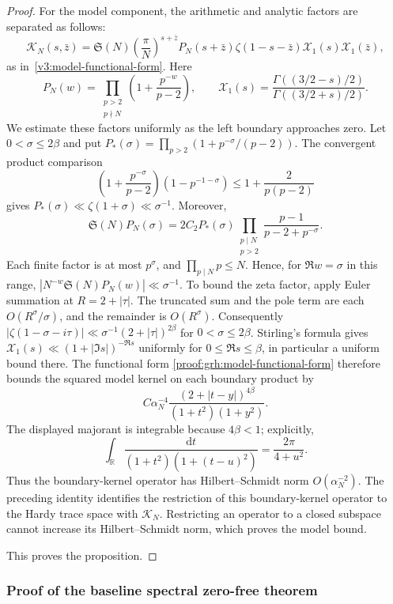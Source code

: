 \documentclass[12pt,a4paper]{amsart}
\numberwithin{equation}{section}
\def\le{\leqslant}
\theoremstyle{plain}
\theoremstyle{definition}
\theoremstyle{remark}
\begin{document}
\begin{proof}
For the model component, the arithmetic and analytic factors are
separated as follows:
\begin{equation}\label{proof:grh:model-functional-form}
 \mathscr K_N(s,\bar z)=\mathfrak S(N)
 \left(\frac\pi N\right)^{s+\bar z}P_N(s+\bar z)
 \zeta(1-s-\bar z)\mathcal X_1(s)\mathcal X_1(\bar z),
\end{equation}
as in~\eqref{v3:model-functional-form}.
Here
\[
 P_N(w)=\prod_{\substack{p>2\\p\nmid N}}
       \left(1+\frac{p^{-w}}{p-2}\right),\qquad
 \mathcal X_1(s)=\frac{\Gamma((3/2-s)/2)}{\Gamma((3/2+s)/2)}.
\]
We estimate these factors uniformly as the left boundary approaches
zero. Let $0<\sigma\le2\beta$ and put
$P_*(\sigma)=\prod_{p>2}(1+p^{-\sigma}/(p-2))$.
The convergent product comparison
\[
 \left(1+\frac{p^{-\sigma}}{p-2}\right)(1-p^{-1-\sigma})
 \le1+\frac2{p(p-2)}
\]
gives $P_*(\sigma)\ll\zeta(1+\sigma)\ll\sigma^{-1}$.
Moreover,
\[
 \mathfrak S(N)P_N(\sigma)
 =2C_2P_*(\sigma)
   \prod_{\substack{p\mid N\\p>2}}
        \frac{p-1}{p-2+p^{-\sigma}}.
\]
Each finite factor is at most $p^\sigma$, and
$\prod_{p\mid N}p\le N$. Hence, for $\Re w=\sigma$ in this range,
$|N^{-w}\mathfrak S(N)P_N(w)|\ll\sigma^{-1}$.
To bound the zeta factor, apply Euler summation at
$R=2+|\tau|$. The truncated sum and the pole term are each
$O(R^\sigma/\sigma)$, and the remainder is $O(R^\sigma)$.
Consequently
$|\zeta(1-\sigma-i\tau)|\ll\sigma^{-1}(2+|\tau|)^{2\beta}$
for $0<\sigma\le2\beta$. Stirling's formula gives
$\mathcal X_1(s)\ll(1+|\Im s|)^{-\Re s}$ uniformly for
$0\le\Re s\le\beta$, in particular a uniform bound there.
The functional form
\eqref{proof:grh:model-functional-form} therefore bounds the squared
model kernel on each boundary product by
\[
 C\alpha_N^{-4}
 \frac{(2+|t-y|)^{4\beta}}{(1+t^2)(1+y^2)}.
\]
The displayed majorant is integrable because $4\beta<1$; explicitly,
\[
 \int_{\mathbb R}
 \frac{\mathrm{d}t}{(1+t^2)(1+(t-u)^2)}=\frac{2\pi}{4+u^2}.
\]
Thus the boundary-kernel operator has Hilbert--Schmidt norm
$O(\alpha_N^{-2})$.
The preceding identity identifies the restriction of this
boundary-kernel operator to the Hardy trace space with
$\mathcal K_N$. Restricting an operator to a closed subspace
cannot increase its Hilbert--Schmidt norm, which proves the
model bound.

This proves the proposition.
\end{proof}

\subsubsection{Proof of the baseline spectral zero-free theorem}
\end{document}
